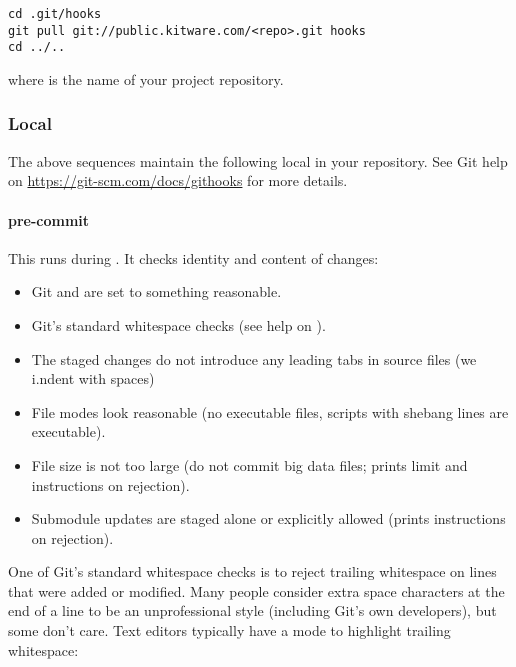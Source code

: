 \begin{verbatim}
cd .git/hooks
git pull git://public.kitware.com/<repo>.git hooks
cd ../..
\end{verbatim}

where  is the name of your project repository.


\subsubsection{Local}
\label{subsubsec:Local}

The above sequences maintain the following local  in your
repository. See Git help on
\href{githooks}{https://git-scm.com/docs/githooks} for more details.


\paragraph{pre-commit}
\label{par:pre-commit}

This runs during . It checks identity and content of changes:
\begin{itemize}
\item Git  and  are set to something
reasonable.
\item Git's standard whitespace checks (see help on ).
\item The staged changes do not introduce any leading tabs in source files (we
i.ndent with spaces)
\item File modes look reasonable (no executable  files, scripts with
shebang lines are executable).
\item File size is not too large (do not commit big data files; prints limit and
instructions on rejection).
\item Submodule updates are staged alone or explicitly allowed (prints
instructions on rejection).
\end{itemize}

One of Git's standard whitespace checks is to reject trailing whitespace on
lines that were added or modified. Many people consider extra space characters
at the end of a line to be an unprofessional style (including Git's own
developers), but some don't care. Text editors typically have a mode to
highlight trailing whitespace:

